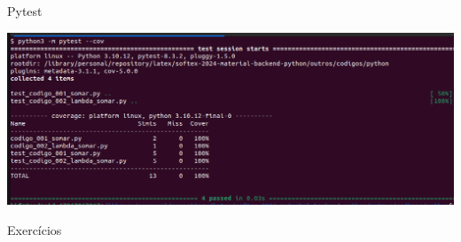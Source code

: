 \begin{frame}[t]{Pytest}
	
	
	
	
	\vspace{1em}
	\centering
	\includegraphics[scale=0.25]{imagens/fig-result-test-lambda-somar.png}
	
\end{frame}




\begin{frame}[t]{Exercícios}
	
	\fontsize{12pt}{19}\par
	\vspace{1em}
	
\end{frame}







